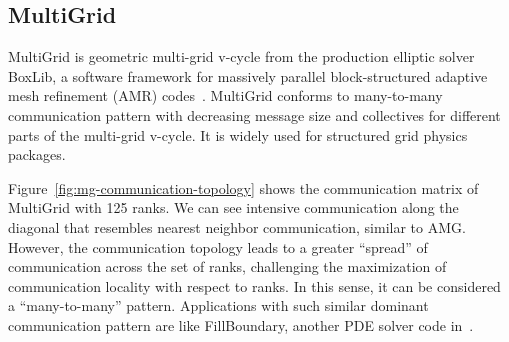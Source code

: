 \subsection{MultiGrid}
\label{sec:multigrid}


MultiGrid is geometric multi-grid v-cycle from the production elliptic solver BoxLib, 
a software framework for massively parallel block-structured adaptive mesh refinement (AMR) codes~\cite{boxlib}. 
MultiGrid conforms to many-to-many communication pattern with decreasing message size and 
collectives for different parts of the multi-grid v-cycle. 
It is widely used for structured grid physics packages. 

Figure~\ref{fig:mg-communication-topology} shows the communication matrix of MultiGrid with 125 ranks. 
We can see intensive communication along the diagonal that resembles nearest neighbor communication, similar to AMG. 
However, the communication topology leads to a greater ``spread'' of communication across the set of ranks, 
challenging the maximization of communication locality with respect to ranks. 
In this sense, it can be considered a ``many-to-many'' pattern. 
Applications with such similar dominant communication pattern are like FillBoundary, another PDE solver code in~\cite{boxlib}.


